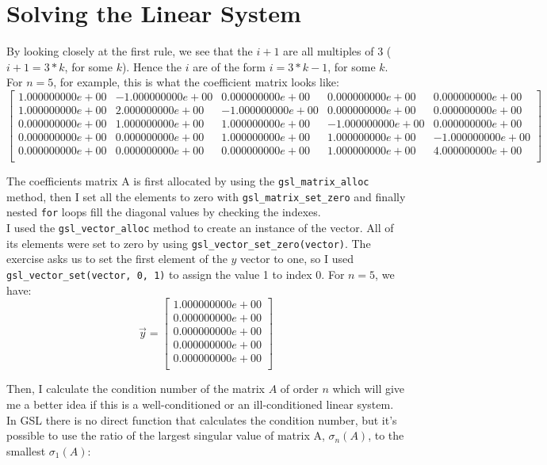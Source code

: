 \documentclass{article}
\newcommand{\code}{\texttt}
\begin{document}
\section{Solving the Linear System}
By looking closely at the first rule, we see that the $i+1$ are all multiples of 3 ($i+1 = 3*k$, for some $k$). Hence the $i$ are of the form $i = 3*k-1$, for some $k$. For $n = 5$, for example, this is what the coefficient matrix looks like:
$$
\begin{bmatrix}
1.000000000e+00 & -1.000000000e+00 & 0.000000000e+00 & 0.000000000e+00 & 0.000000000e+00 \\ 
1.000000000e+00 & 2.000000000e+00 & -1.000000000e+00 & 0.000000000e+00 & 0.000000000e+00 \\ 
0.000000000e+00 & 1.000000000e+00 & 1.000000000e+00 & -1.000000000e+00 & 0.000000000e+00 \\ 
0.000000000e+00 & 0.000000000e+00 & 1.000000000e+00 & 1.000000000e+00 & -1.000000000e+00 \\ 
0.000000000e+00 & 0.000000000e+00 & 0.000000000e+00 & 1.000000000e+00 & 4.000000000e+00 \\
\end{bmatrix}
$$

The coefficients matrix A is first allocated by using the \code{gsl\_matrix\_alloc} method, then I set all the elements to zero with \code{gsl\_matrix\_set\_zero} and finally nested \code{for} loops fill the diagonal values by checking the indexes.\\

I used the \code{gsl\_vector\_alloc} method to create an instance of the vector. All of its elements were set to zero by using \code{gsl\_vector\_set\_zero(vector)}. The exercise asks us to set the first element of the $y$ vector to one, so I used \code{gsl\_vector\_set(vector, 0, 1)} to assign the value 1 to index 0. For $n=5$, we have:
$$
\vec{y}=
\begin{bmatrix}
1.000000000e+00 \\
0.000000000e+00 \\
0.000000000e+00 \\
0.000000000e+00 \\
0.000000000e+00 \\
\end{bmatrix}
$$

Then, I calculate the condition number of the matrix $A$ of order $n$ which will give me a better idea if this is a well-conditioned or an ill-conditioned linear system. In GSL there is no direct function that calculates the condition number, but it's possible to use the ratio of the largest singular value of matrix A, $\sigma_n (A)$, to the smallest $\sigma_1 (A)$:
\end{document}
